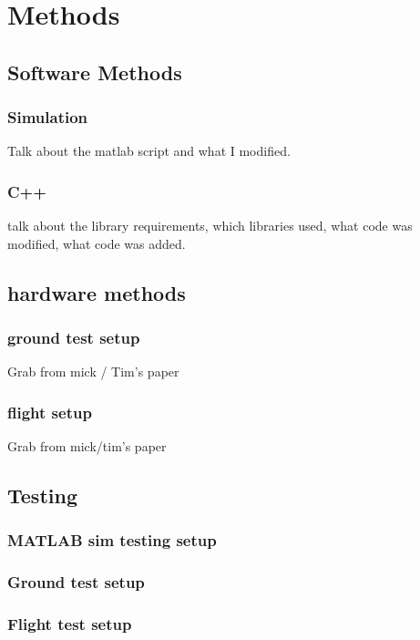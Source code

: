 \chapter{Methods}

\section{Software Methods}
\subsection{Simulation}
Talk about the matlab script and what I modified.
\subsection{C++}
talk about the library requirements, which libraries used, what code was modified, what code was added.
\section{hardware methods}
\subsection{ground test setup}
Grab from mick / Tim's paper
\subsection{flight setup}
Grab from mick/tim's paper

\section{Testing}
\subsection{MATLAB sim testing setup}
\subsection{ Ground test setup}
\subsection{Flight test setup}
